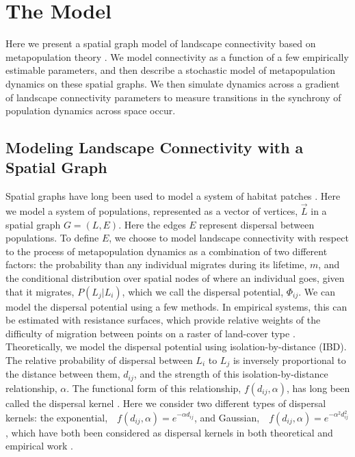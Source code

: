 \documentclass[]{article}
\begin{document}
\pagebreak

\hypertarget{the-model}{%
\section{The Model}\label{the-model}}

Here we present a spatial graph model of landscape connectivity based on
metapopulation theory \cite{hanski_practical_1994, grilli_metapopulation_2015} . We model connectivity as a function of
a few empirically estimable parameters, and then describe a stochastic
model of metapopulation dynamics on these spatial graphs. We then
simulate dynamics across a gradient of landscape
connectivity parameters to measure transitions in the synchrony of
population dynamics across space occur.

\hypertarget{modeling-landscape-connectivity-with-a-spatial-graph}{%
\subsection{Modeling Landscape Connectivity with a Spatial
Graph}\label{modeling-landscape-connectivity-with-a-spatial-graph}}

Spatial graphs have long been used to model a system of habitat patches
\cite{dale_graphs_2010, minor_graph-theory_2008,
urban_landscape_2001}. Here we model a system of populations, represented as a vector of
vertices, $\vec{L}$ in a spatial graph \(G=(L,E)\). Here the edges \(E\)  represent dispersal between populations. To define $E$,  we choose to model landscape connectivity with respect to the process of metapopulation dynamics as a combination of two different factors: the probability than any individual migrates during its lifetime, $m$, and the conditional distribution over spatial nodes of where an individual goes, given that
it migrates, \(P(L_j|L_i)\), which we call the dispersal potential, $\Phi_{ij}$. We can model the dispersal potential using a few methods. In empirical
systems, this can be estimated with resistance surfaces, which provide
relative weights of the difficulty of migration between points on a
raster of land-cover type \cite{spear_use_2010}. Theoretically, we model
the dispersal potential using isolation-by-distance (IBD). The relative
probability of dispersal between \(L_i\) to \(L_j\) is inversely
proportional to the distance between them, \(d_{ij}\), and the strength
of this isolation-by-distance relationship, \(\alpha\). The
functional form of this relationship, \(f(d_{ij}, \alpha)\), has long been called the dispersal kernel \cite{hanski_practical_1994}.
Here we consider two different types of dispersal kernels: the
exponential, \(f(d_{ij}, \alpha)=e^{-\alpha d_{ij}}\), and
Gaussian, \(f(d_{ij}, \alpha)=e^{-\alpha^2 d_{ij}^2}\), which have both been considered as dispersal kernels in both theoretical and empirical work \cite{hanski_practical_1994,grilli_metapopulation_2015}.
\end{document}
